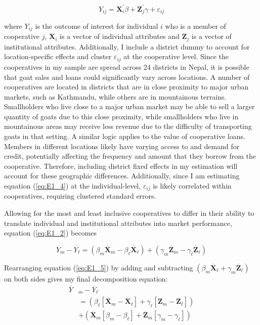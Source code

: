 \documentclass[11pt]{article}
\begin{document}
\begin{equation} \label{eq:E1_4}
   Y_{ij} = \mathbf{X}_i^{\prime}\beta + \mathbf{Z}_j^{\prime}\gamma + \varepsilon_{ij}
\end{equation}  

where $Y_{ij}$ is the outcome of interest for individual $i$ who is a member of cooperative $j$, $\mathbf{X}_i$ is a vector of individual attributes and $\mathbf{Z}_j$ is a vector of institutional attributes. Additionally, I include a district dummy to account for location-specific effects and cluster $\varepsilon_{ij}$ at the cooperative level. Since the cooperatives in my sample are spread across 24 districts in Nepal, it is possible that goat sales and loans could significantly vary across locations. A number of cooperatives are located in districts that are in close proximity to major urban markets, such as Kathmandu, while others are in mountainous terrains. Smallholders who live close to a major urban market may be able to sell a larger quantity of goats due to this close proximity, while smallholders who live in mountainous areas may receive less revenue due to the difficulty of transporting goats in that setting. A similar logic applies to the value of cooperative loans. Members in different locations likely have varying access to and demand for credit, potentially affecting the frequency and amount that they borrow from the cooperative. Therefore, including district fixed effects in my estimation will account for these geographic differences. Additionally, since I am estimating equation (\ref{eq:E1_4}) at the individual-level, $\varepsilon_{ij}$ is likely correlated within cooperatives, requiring clustered standard errors. 

Allowing for the most and least inclusive cooperatives to differ in their ability to translate individual and institutional attributes into market performance, equation (\ref{eq:E1_2}) becomes

\begin{equation} \label{eq:E1_5}
        \overline{Y}_{m} - \overline{Y}_{\ell} =  (\beta_{m}\overline{\mathbf{X}}_{m} - \beta_{\ell}\overline{\mathbf{X}}_{\ell}) + (\gamma_{m}\overline{\mathbf{Z}}_{m} - \gamma_{\ell}\overline{\mathbf{Z}}_{\ell})
\end{equation}  

Rearranging equation (\ref{eq:E1_5}) by adding and subtracting $(\beta_{m}\overline{\mathbf{X}}_{\ell} + \gamma_{m}\overline{\mathbf{Z}}_{\ell})$ on both sides gives my final decomposition equation:
\begin{subequations}
    \begin{align}
        \overline{Y}&_{m} - \overline{Y}_{\ell} \label{eq:E1_6a} \\
        &= (\beta_{\ell}[\overline{\mathbf{X}}_{m} - \overline{\mathbf{X}}_{\ell}] + \gamma_{\ell}[\overline{\mathbf{Z}}_{m} - \overline{\mathbf{Z}}_{\ell}]) \label{eq:E1_6b} \\
        &+ (\overline{\mathbf{X}}_{m}[\beta_{m} - \beta_{\ell}] + \overline{\mathbf{Z}}_{m}[\gamma_{m} - \gamma_{\ell}]) \label{eq:E1_6c}
    \end{align}
\end{subequations}  
\end{document}
